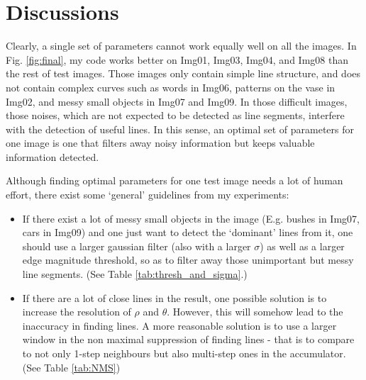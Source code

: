 \documentclass[
  course = {{16-720B Computer Vision}},
  quartile = {{1}},
  assignment = 1-Hough\ Transform,
  name = {{Kangle Deng}},
  email = {{kangled@andrew.cmu.edu}},
  firstexercise = 1
]{aga-homework}
\begin{document}
\section{Discussions}
Clearly, a single set of parameters cannot work equally well on all the images. In Fig. \ref{fig:final}, my code works better on Img01, Img03, Img04, and Img08 than the rest of test images. Those images only contain simple line structure, and does not contain complex curves such as words in Img06, patterns on the vase in Img02, and messy small objects in Img07 and Img09. In those difficult images, those noises, which are not expected to be detected as line segments, interfere with the detection of useful lines. In this sense, an optimal set of parameters for one image is one that filters away noisy information but keeps valuable information detected.

Although finding optimal parameters for one test image needs a lot of human effort, there exist some `general' guidelines from my experiments:

\begin{itemize}
    \item If there exist a lot of messy small objects in the image (E.g. bushes in Img07, cars in Img09) and one just want to detect the `dominant' lines from it, one should use a larger gaussian filter (also with a larger $\sigma$) as well as a larger edge magnitude threshold, so as to filter away those unimportant but messy line segments. (See Table \ref{tab:thresh_and_sigma}.)
    \item If there are a lot of close lines in the result, one possible solution is to increase the resolution of $\rho$ and $\theta$. However, this will somehow lead to the inaccuracy in finding lines. A more reasonable solution is to use a larger window in the non maximal suppression of finding lines - that is to compare to not only 1-step neighbours but also multi-step ones in the accumulator. (See Table \ref{tab:NMS})
\end{itemize}
\end{document}
